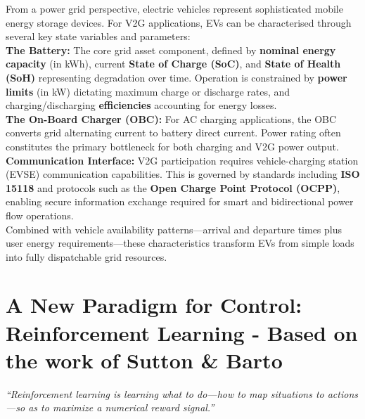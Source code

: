 \noindent
From a power grid perspective, electric vehicles represent sophisticated mobile energy storage devices. For V2G applications, EVs can be characterised through several key state variables and parameters:
\\
\noindent
    \textbf{The Battery:} The core grid asset component, defined by \textbf{nominal energy capacity} (in kWh), current \textbf{State of Charge (SoC)}, and \textbf{State of Health (SoH)} representing degradation over time. Operation is constrained by \textbf{power limits} (in kW) dictating maximum charge or discharge rates, and charging/discharging \textbf{efficiencies} accounting for energy losses.
    \\
    \noindent
    \textbf{The On-Board Charger (OBC):} For AC charging applications, the OBC converts grid alternating current to battery direct current. Power rating often constitutes the primary bottleneck for both charging and V2G power output.
    \\
\noindent    
  \textbf{Communication Interface:} V2G participation requires vehicle-charging station (EVSE) communication capabilities. This is governed by standards including \textbf{ISO 15118} and protocols such as the \textbf{Open Charge Point Protocol (OCPP)}, enabling secure information exchange required for smart and bidirectional power flow operations.
\\
\noindent
Combined with vehicle availability patterns—arrival and departure times plus user energy requirements—these characteristics transform EVs from simple loads into fully dispatchable grid resources.
\newpage

\section{A New Paradigm for Control: Reinforcement Learning - Based on the work of Sutton \& Barto}



\begin{center}
    \begin{minipage}{0.85\textwidth}
        \large\itshape
        ``Reinforcement learning is learning what to do---how to map situations to actions---so as to maximize a numerical reward signal.''
    \end{minipage}
\end{center}

